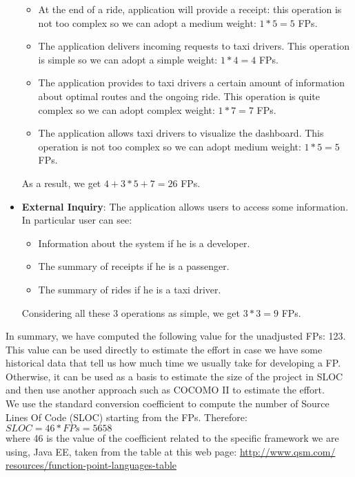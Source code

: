 \begin{itemize}
\begin{itemize}
		\item At the end of a ride, application will provide a receipt: this operation is not too complex so we can adopt a medium weight: $1*5 = 5$ FPs.
		\item The application delivers incoming requests to taxi drivers. This operation is simple so we can adopt a simple weight: $1*4 = 4$ FPs.
		\item The application provides to taxi drivers a certain amount of information about optimal routes and the ongoing ride. This operation is quite complex so we can adopt complex weight: $1*7 = 7$ FPs.
		\item The application allows taxi drivers to visualize the dashboard. This operation is not too complex so we can adopt medium weight: $1*5 = 5$ FPs.
	\end{itemize}
	As a result, we get $4 + 3*5 + 7 = 26$ FPs.
	\item \textbf{External Inquiry}: The application allows users to access some information. In particular user can see:
	\begin{itemize}
		\item Information about the system if he is a developer.
		\item The summary of receipts if he is a passenger.
		\item The summary of rides if he is a taxi driver.
	\end{itemize}
	Considering all these 3 operations as simple, we get $3*3 = 9$ FPs.
\end{itemize}

\noindent In summary, we have computed the following value for the unadjusted FPs: 123. This value can be used directly to estimate the effort in case we have some historical data that tell us how much time we usually take for developing a FP. Otherwise, it can be used as a basis to estimate the size of the project in SLOC and then use another approach such as COCOMO II to estimate the effort. \\
We use the standard conversion coefficient to compute the number of Source Lines Of Code (SLOC) starting from the FPs. Therefore:\\
$SLOC = 46 * FPs = 5658$ \\
where 46 is the value of the coefficient related to the specific framework we are using, Java EE, taken from the table at this web page: \href{http://www.qsm.com/resources/function-point-languages-table}{http://www.qsm.com/\\resources/function-point-languages-table}
